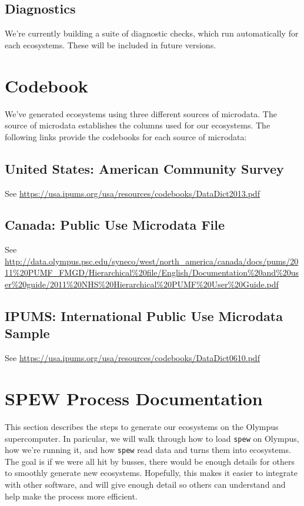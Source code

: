 \documentclass{article}
\begin{document}
\subsection{Diagnostics}
	We're currently building a suite of diagnostic checks, which run automatically for each ecosystems. These will be included in future versions.

\newpage
\nocite{*}
\printbibliography

\newpage 
\appendix

\section{Codebook}
We've generated ecosystems using three different sources of microdata. The source of microdata establishes the columns used for our ecosystems. The following links provide the codebooks for each source of microdata:

\subsection{United States: American Community Survey}
	See \url{https://usa.ipums.org/usa/resources/codebooks/DataDict2013.pdf}

\subsection{Canada: Public Use Microdata File}
	See \url{http://data.olympus.psc.edu/syneco/west/north_america/canada/docs/pums/2011%20PUMF_FMGD/Hierarchical%20file/English/Documentation%20and%20user%20guide/2011%20NHS%20Hierarchical%20PUMF%20User%20Guide.pdf}

\subsection{IPUMS: International Public Use Microdata Sample}
	See \url{https://usa.ipums.org/usa/resources/codebooks/DataDict0610.pdf}


\newpage 
\section{SPEW Process Documentation}
This section describes the steps to generate our ecosystems on the Olympus supercomputer. In paricular, we will walk through how to load \verb|spew| on Olympus, how we're running it, and how \verb|spew| read data and turns them into ecosystems. The goal is if we were all hit by busses, there would be enough details for others to smoothly generate new ecosystems. Hopefully, this makes it easier to integrate with other software, and will give enough detail so others can understand and help make the process more efficient. 
\end{document}
